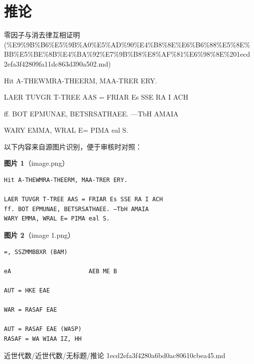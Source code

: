 \section*{推论}

\begin{note}[来源上级主题]

零因子与消去律互相证明 (\%E9\%9B\%B6\%E5\%9B\%A0\%E5\%AD\%90\%E4\%B8\%8E\%E6\%B6\%88\%E5\%8E\%BB\%E5\%BE\%8B\%E4\%BA\%92\%E7\%9B\%B8\%E8\%AF\%81\%E6\%98\%8E\%201ecd2efa3f42809fa11dc863d390a502.md)

\end{note}

\begin{note}[推论]

Hit A-THEWMRA-THEERM, MAA-TRER ERY.

LAER TUVGR T-TREE AAS = FRIAR Es SSE RA I ACH

ff. BOT EPMUNAE, BETSRSATHAEE. —TbH AMAIA

WARY EMMA, WRAL E= PIMA eal S.

\end{note}

\begin{note}
以下内容来自源图片识别，便于审核时对照：

\textbf{图片 1}（image.png）
\begin{Verbatim}[fontsize=\small]
Hit A-THEWMRA-THEERM, MAA-TRER ERY.

LAER TUVGR T-TREE AAS = FRIAR Es SSE RA I ACH
ff. BOT EPMUNAE, BETSRSATHAEE. —TbH AMAIA
WARY EMMA, WRAL E= PIMA eal S.
\end{Verbatim}

\textbf{图片 2}（image 1.png）
\begin{Verbatim}[fontsize=\small]
=, SSZMMBBXR (BAM)

eA                      AEB ME B

AUT = HKE EAE

WAR = RASAF EAE

AUT = RASAF EAE (WASP)
RASAF = WA WIAA IZ, HH
\end{Verbatim}

\end{note}

\begin{note}[来源路径]

近世代数/近世代数/无标题/推论 1ecd2efa3f4280a6bd0ac80610cbea45.md

\end{note}

